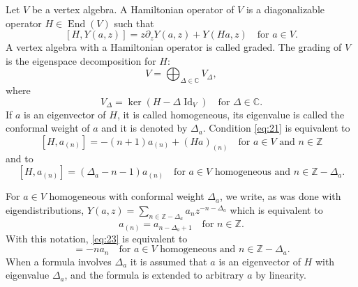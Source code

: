 \documentclass[a4paper, 12pt, reqno]{amsart}
\theoremstyle{remark}
\numberwithin{equation}{subsection}
\DeclareMathOperator{\Id}{Id}
\DeclareMathOperator{\End}{End}
\begin{document}
Let $V$ be a vertex algebra.
A Hamiltonian operator of $V$ is a diagonalizable operator $H \in \End(V)$ such that
\begin{equation}
  \label{eq:21}
  [H, Y(a, z)] = z\partial_zY(a, z) + Y(Ha, z) \quad \text{for }a \in V.
\end{equation}
A vertex algebra with a Hamiltonian operator is called graded.
The grading of $V$ is the eigenspace decomposition for $H$:
\begin{equation*}
  V = \bigoplus_{\Delta \in \mathbb{C}}V_{\Delta},
\end{equation*}
where
\begin{equation*}
  V_{\Delta} = \ker(H - \Delta\Id_V) \quad \text{for }\Delta \in \mathbb{C}.
\end{equation*}
If $a$ is an eigenvector of $H$, it is called homogeneous, its eigenvalue is called the conformal weight of $a$ and it is denoted by $\Delta_a$.
Condition \eqref{eq:21} is equivalent to
\begin{equation}
  \label{eq:22}
  [H,a_{(n)}] = -(n + 1)a_{(n)} + (Ha)_{(n)} \quad \text{for }a \in V\text{ and }n \in \mathbb{Z}
\end{equation}
and to
\begin{equation}
  \label{eq:23}
  [H, a_{(n)}] = (\Delta_a - n - 1)a_{(n)} \quad \text{for }a \in V\text{ homogeneous and }n \in \mathbb{Z} - \Delta_a.
\end{equation}

For $a \in V$ homogeneous with conformal weight $\Delta_a$, we write, as was done with eigendistributions, $Y(a,z) = \sum_{n \in \mathbb{Z} - \Delta_a}a_nz^{-n - \Delta_a}$ which is equivalent to
\begin{equation*}
  a_{(n)} = a_{n - \Delta_a + 1} \quad \text{for }n \in \mathbb{Z}.
\end{equation*}
With this notation, \eqref{eq:23} is equivalent to
\begin{equation*}
  [H, a_n] = -na_n \quad \text{for } a \in V\text{ homogeneous and }n \in \mathbb{Z} - \Delta_a.
\end{equation*}
When a formula involves $\Delta_a$ it is assumed that $a$ is an eigenvector of $H$ with eigenvalue $\Delta_a$, and the formula is extended to arbitrary $a$ by linearity.
\end{document}
